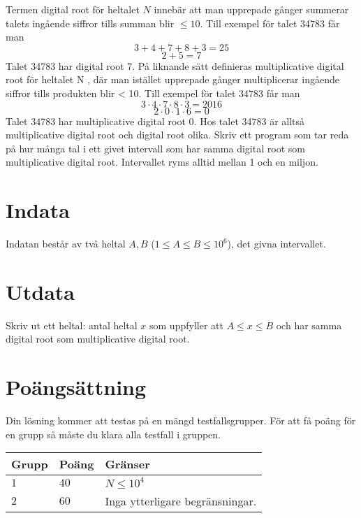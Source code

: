 Termen digital root för heltalet $N$ innebär att man upprepade gånger summerar talets
ingående siffror tills summan blir $\le 10$. Till exempel för talet 34783 får man
$$3 + 4 + 7 + 8 + 3 = 25$$
$$2+5=7$$
Talet 34783 har digital root 7.
På liknande sätt definieras multiplicative digital root för heltalet N , där man istället
upprepade gånger multiplicerar ingående siffror tills produkten blir < 10. Till exempel
för talet 34783 får man
$$3 \cdot 4 \cdot 7 \cdot 8 \cdot 3 = 2016$$
$$2 \cdot 0 \cdot 1 \cdot 6 = 0$$
Talet 34783 har multiplicative digital root 0. Hos talet 34783 är alltså multiplicative
digital root och digital root olika.
Skriv ett program som tar reda på hur många tal i ett givet intervall som har samma
digital root som multiplicative digital root. Intervallet ryms alltid mellan 1 och en
miljon.

\section*{Indata}
Indatan består av två heltal $A,B$ ($1 \le A \le B \le 10^6$), det givna intervallet.

\section*{Utdata}
Skriv ut ett heltal: antal heltal $x$ som uppfyller att $A \leq x \leq B$ och har samma digital root som multiplicative digital root.

\section*{Poängsättning}
Din lösning kommer att testas på en mängd testfallsgrupper.
För att få poäng för en grupp så måste du klara alla testfall i gruppen.

\noindent
\begin{tabular}{| l | l | p{12cm} |}
  \hline
  \textbf{Grupp} & \textbf{Poäng} & \textbf{Gränser} \\ \hline
  $1$    & $40$          & $N \leq 10^4$  \\ \hline
  $2$    & $60$          & Inga ytterligare begränsningar.  \\ \hline
\end{tabular}

